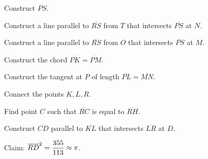 Construct $\overline{PS}$.

Construct a line parallel to $\overline{RS}$ from $T$ that intersects $\overline{PS}$ at $N$.

Construct a line parallel to $\overline{RS}$ from $O$ that intersects $\overline{PS}$ at $M$.

Construct the chord $\overline{PK}=\overline{PM}$.

Construct the tangent at $P$ of length $\overline{PL}=\overline{MN}$.

Connect the points $K,L,R$.

Find point $C$ such that $\overline{RC}$ is equal to $\overline{RH}$.

Construct $\overline{CD}$ parallel to $\overline{KL}$ that intersects $\overline{LR}$ at $D$. 

Claim: $\overline{RD}^2=\displaystyle\frac{355}{113}\approx \pi$.


